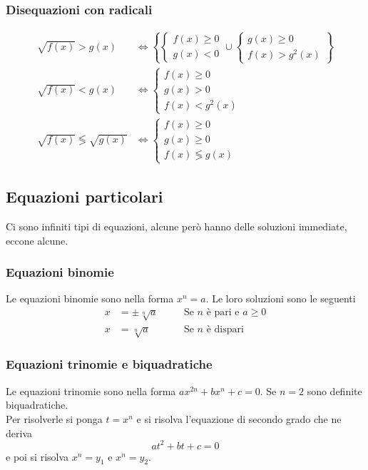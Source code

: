 \subsubsection{Disequazioni con radicali}
\begin{align*}
  \sqrt{f(x)} > g(x) &\Leftrightarrow \left\{\begin{cases}
      f(x) \geq 0\\
      g(x) < 0
    \end{cases} \cup \begin{cases}
      g(x) \geq 0\\
      f(x) > g^2(x)
  \end{cases}\right\}\\
  \sqrt{f(x)} < g(x) &\Leftrightarrow \begin{cases}
    f(x) \geq 0\\
    g(x) > 0\\
    f(x) < g^2(x)
  \end{cases}\\
  \sqrt{f(x)} \lessgtr \sqrt{g(x)} &\Leftrightarrow \begin{cases}
    f(x) \geq 0\\
    g(x) \geq 0\\
    f(x) \lessgtr g(x)
  \end{cases}
\end{align*}

\subsection{Equazioni particolari}
Ci sono infiniti tipi di equazioni, alcune però hanno delle soluzioni immediate, eccone alcune.

\subsubsection{Equazioni binomie}
Le equazioni binomie sono nella forma $x^n = a$. Le loro soluzioni sono le seguenti
\begin{align*}
  x &= \pm\sqrt[n]{a} &\quad &\text{Se $n$ è pari e $a\geq0$}\\
  x &= \sqrt[n]{a} &\quad &\text{Se $n$ è dispari}
\end{align*}

\subsubsection{Equazioni trinomie e biquadratiche}
Le equazioni trinomie sono nella forma $ax^{2n} + bx^n + c =0$. Se $n=2$ sono definite biquadratiche.\\
Per risolverle si ponga $t = x^n$ e si risolva l'equazione di secondo grado che ne deriva
\begin{equation*}
  at^2 + bt + c = 0
\end{equation*}
e poi si risolva $x^n = y_1$ e $x^n = y_2$.

